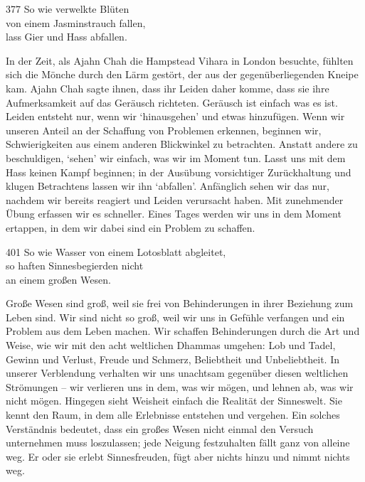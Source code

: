 
\begin{dhpVerse}{377}
\label{dhp-377}
So wie verwelkte Blüten\\ 
von einem Jasminstrauch fallen,\\ 
lass Gier und Hass abfallen. 
\end{dhpVerse}

\begin{dhpRefl}

In der Zeit, als Ajahn Chah die Hampstead Vihara in London besuchte, fühlten
sich die Mönche durch den Lärm gestört, der aus der gegenüberliegenden Kneipe
kam. Ajahn Chah sagte ihnen, dass ihr Leiden daher komme, dass sie ihre
Aufmerksamkeit auf das Geräusch richteten. Geräusch ist einfach was es ist.
Leiden entsteht nur, wenn wir `hinausgehen' und etwas hinzufügen. Wenn wir
unseren Anteil an der Schaffung von Problemen erkennen, beginnen wir,
Schwierigkeiten aus einem anderen Blickwinkel zu betrachten. Anstatt andere zu
beschuldigen, `sehen' wir einfach, was wir im Moment tun. Lasst uns mit dem
Hass keinen Kampf beginnen; in der Ausübung vorsichtiger Zurückhaltung und
klugen Betrachtens lassen wir ihn `abfallen'. Anfänglich sehen wir das nur,
nachdem wir bereits reagiert und Leiden verursacht haben. Mit zunehmender
Übung erfassen wir es schneller. Eines Tages werden wir uns in dem Moment
ertappen, in dem wir dabei sind ein Problem zu schaffen.

\end{dhpRefl}


\begin{dhpVerse}{401}
\label{dhp-401}
So wie Wasser von einem Lotosblatt abgleitet,\\ 
so haften Sinnesbegierden nicht\\ 
an einem großen Wesen. 
\end{dhpVerse}

\begin{dhpRefl}

Große Wesen sind groß, weil sie frei von Behinderungen in ihrer Beziehung zum
Leben sind. Wir sind nicht so groß, weil wir uns in Gefühle verfangen und ein
Problem aus dem Leben machen. Wir schaffen Behinderungen durch die Art und
Weise, wie wir mit den acht weltlichen Dhammas umgehen: Lob und Tadel, Gewinn
und Verlust, Freude und Schmerz, Beliebtheit und Unbeliebtheit. In unserer
Verblendung verhalten wir uns unachtsam gegenüber diesen weltlichen Strömungen
-- wir verlieren uns in dem, was wir mögen, und lehnen ab, was wir nicht
mögen. Hingegen sieht Weisheit einfach die Realität der Sinneswelt. Sie kennt
den Raum, in dem alle Erlebnisse entstehen und vergehen. Ein solches
Verständnis bedeutet, dass ein großes Wesen nicht einmal den Versuch
unternehmen muss loszulassen; jede Neigung festzuhalten fällt ganz von alleine
weg. Er oder sie erlebt Sinnesfreuden, fügt aber nichts hinzu und nimmt nichts
weg.

\end{dhpRefl}

